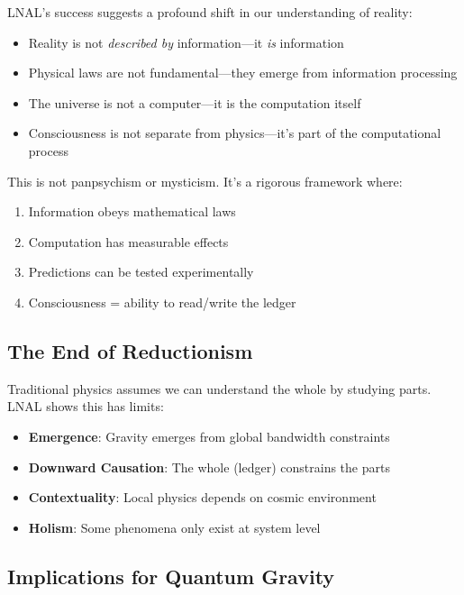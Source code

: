 \documentclass[12pt,letterpaper]{article}
\begin{document}
LNAL's success suggests a profound shift in our understanding of reality:

\begin{tcolorbox}[colback=blue!5, colframe=blue!50!black, title=The Computational Universe]
\begin{itemize}
    \item Reality is not \textit{described by} information—it \textit{is} information
    \item Physical laws are not fundamental—they emerge from information processing
    \item The universe is not a computer—it is the computation itself
    \item Consciousness is not separate from physics—it's part of the computational process
\end{itemize}
\end{tcolorbox}

This is not panpsychism or mysticism. It's a rigorous framework where:
\begin{enumerate}
    \item Information obeys mathematical laws
    \item Computation has measurable effects
    \item Predictions can be tested experimentally
    \item Consciousness = ability to read/write the ledger
\end{enumerate}

\subsection{The End of Reductionism}

Traditional physics assumes we can understand the whole by studying parts. LNAL shows this has limits:

\begin{itemize}
    \item \textbf{Emergence}: Gravity emerges from global bandwidth constraints
    \item \textbf{Downward Causation}: The whole (ledger) constrains the parts
    \item \textbf{Contextuality}: Local physics depends on cosmic environment
    \item \textbf{Holism}: Some phenomena only exist at system level
\end{itemize}

\subsection{Implications for Quantum Gravity}
\end{document}
